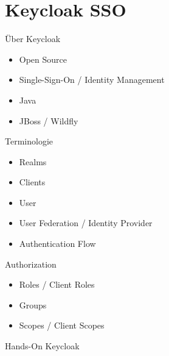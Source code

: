 \section{Keycloak  SSO}


\begin{frame}{Über Keycloak}
	\begin{itemize}
		\item Open Source
		\item Single-Sign-On / Identity Management
		\item Java
		\item JBoss / Wildfly
	\end{itemize}
\end{frame}

\begin{frame}{Terminologie}
	\begin{itemize}
		\item Realms
		\item Clients
		\item User
		\item User Federation / Identity Provider
		\item Authentication Flow
	\end{itemize}
\end{frame}

\begin{frame}{Authorization}
	\begin{itemize}
		\item Roles / Client Roles
		\item Groups
		\item Scopes / Client Scopes
	\end{itemize}
\end{frame}


\begin{frame}[standout]
Hands-On Keycloak
\end{frame}